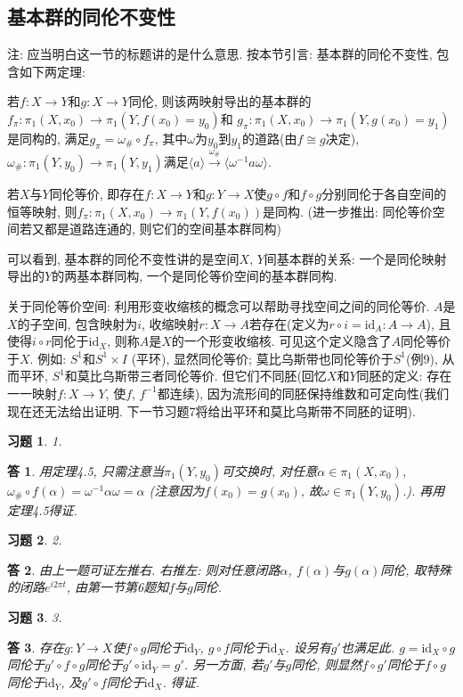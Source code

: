 \documentclass{ctexart}%
\newtheorem*{exercise}{习题}
\newtheorem*{solution}{答}
\theoremstyle{definition}
\theoremstyle{remark}
\begin{document}
\subsection{基本群的同伦不变性}

注: 应当明白这一节的标题讲的是什么意思. 按本节引言: 基本群的同伦不变性, 包含如下两定理:

若$f:X\rightarrow Y$和$g:X\rightarrow Y$同伦, 则该两映射导出的基本群的$f_\pi:\pi_1(X,x_0)\rightarrow \pi_1(Y,f(x_0)=y_0)$和 $g_\pi:\pi_1(X,x_0)\rightarrow \pi_1(Y,g(x_0)=y_1)$是同构的, 满足$g_\pi=\omega_\#\circ f_\pi$, 其中$\omega$为$y_0$到$y_1$的道路(由$f\cong g$决定), $\omega_\#: \pi_1(Y,y_0)\rightarrow \pi_1(Y,y_1)$满足$\langle a\rangle\overset{\omega_\#}{\rightarrow} \langle \omega^{-1} a \omega \rangle$. 

 若$X$与$Y$同伦等价, 即存在$f:X\rightarrow Y$和$g:Y\rightarrow X$使$g\circ f$和$f\circ g$分别同伦于各自空间的恒等映射, 则$f_\pi:\pi_1(X,x_0)\rightarrow \pi_1(Y,f(x_0))$是同构. (进一步推出: 同伦等价空间若又都是道路连通的, 则它们的空间基本群同构)
 
可以看到, 基本群的同伦不变性讲的是空间$X$, $Y$间基本群的关系: 一个是同伦映射导出的$Y$的两基本群同构, 一个是同伦等价空间的基本群同构.

关于同伦等价空间: 利用形变收缩核的概念可以帮助寻找空间之间的同伦等价. $A$是$X$的子空间, 包含映射为$i$, 收缩映射$r:X\rightarrow A$若存在(定义为$r\circ i=\text{id}_A:A\rightarrow A$), 且使得$i\circ r$同伦于$\text{id}_X$, 则称$A$是$X$的一个形变收缩核. 可见这个定义隐含了$A$同伦等价于$X$. 例如: $S^1$和$S^1\times I$ (平环), 显然同伦等价; 莫比乌斯带也同伦等价于$S^1$(例9), 从而平环, $S^1$和莫比乌斯带三者同伦等价. 但它们不同胚(回忆$X$和$Y$同胚的定义: 存在一一映射$f:X\rightarrow Y$, 使$f$, $f^{-1}$都连续), 因为流形间的同胚保持维数和可定向性(我们现在还无法给出证明. 下一节习题7将给出平环和莫比乌斯带不同胚的证明).
   
\begin{exercise}1.
\end{exercise}
\begin{solution}
用定理4.5, 只需注意当$\pi_1(Y,y_0)$可交换时, 对任意$\alpha\in \pi_1(X,x_0)$, $\omega_\#\circ f(\alpha)
=\omega^{-1}\alpha\omega=\alpha$ (注意因为$f(x_0)=g(x_0)$, 故$\omega\in \pi_1(Y,y_0)$.). 再用定理4.5得证.
\end{solution}
\begin{exercise}2.
\end{exercise}
\begin{solution}
由上一题可证左推右. 右推左: 则对任意闭路$\alpha$, $f(\alpha)$与$g(\alpha)$同伦, 取特殊的闭路$e^{i 2\pi t}$, 由第一节第6题知$f$与$g$同伦. 
\end{solution}
\begin{exercise}3.
\end{exercise}
\begin{solution}
存在$g:Y\rightarrow X$使$f\circ g$同伦于$\text{id}_Y$, $g\circ f$同伦于$\text{id}_X$. 设另有$g'$也满足此. $g=\text{id}_X\circ g$同伦于$g'\circ f\circ g$同伦于$g'\circ\text{id}_Y=g'$. 另一方面, 若$g'$与$g$同伦, 则显然$f\circ g'$同伦于$f\circ g$同伦于$\text{id}_Y$, 及$g'\circ f$同伦于$\text{id}_X$. 得证.
\end{solution}
\end{document}
